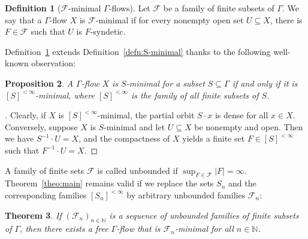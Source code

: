 \documentclass[11pt,reqno,psamsfonts]{amsart}
\theoremstyle{bfnote}
\newtheorem{theo}{Theorem}[section]
\newtheorem{prop}[theo]{Proposition}
\newtheorem{corl}[theo]{Corollary}
\theoremstyle{definition}
\newtheorem{defn}[theo]{Definition}
\theoremstyle{remark}
\newcommand{\0}{\varnothing}
\newcommand{\bemph}[1]{{\normalfont#1}}
\newcommand{\ep}[1]{\bemph{(}#1\bemph{)}}
\newcommand{\emphd}[1]{{\fontseries{b}\selectfont\textsf{#1}}}
\newcommand{\G}{\Gamma}
\newcommand{\fs}[2]{{[{#1}]^{#2}}}
\newcommand{\finset}[1]{\fs{{#1}}{{<\infty}}}
\newcommand{\N}{\mathbb{N}}
\numberwithin{equation}{section}
\newenvironment{scproof}[1][]{\begin{proof}[\textsc{\upshape{Proof}}#1]}{\end{proof}}
\begin{document}
    \begin{defn}[$\mathcal{F}$-minimal $\G$-flows]\label{defn:F-minimal}
        Let $\mathcal{F}$ be a family of finite subsets of $\G$. We say that a $\G$-flow $X$ is \emphd{$\mathcal{F}$-minimal} if for every nonempty open set $U \subseteq X$, there is $F \in \mathcal{F}$ such that $U$ is $F$-syndetic. %
    \end{defn}

    Definition~\ref{defn:F-minimal} extends Definition~\ref{defn:S-minimal} thanks to the following well-known observation:

    \begin{prop}\label{prop:synd1}
        A $\G$-flow $X$ is $S$-minimal for a subset $S \subseteq \G$ if and only if it is $\finset{S}$-minimal, where $\finset{S}$ is the family of all finite subsets of $S$. %
    \end{prop}
    \begin{scproof}
        Clearly, if $X$ is $\finset{S}$-minimal, the partial orbit
        $S \cdot x$ is dense for all $x \in X$. Conversely, suppose $X$ is $S$-minimal and let $U \subseteq X$ be nonempty and open. Then we have  %
        $S^{-1} \cdot U = X$, and the compactness of $X$ yields a finite set $F \in \finset{S}$ such that $F^{-1}\cdot U = X$. %
    \end{scproof}

    A family of finite sets $\mathcal{F}$ is called \emphd{unbounded} if $\sup_{F \in \mathcal{F}} |F| = \infty$. Theorem~\ref{theo:main} %
    remains valid if we replace the sets $S_n$ and the corresponding families $\finset{S_n}$ by {arbitrary} unbounded families $\mathcal{F}_n$: %

    \begin{tcolorbox}
    \begin{theo}\label{theo:main_prime}
        If $(\mathcal{F}_n)_{n \in \N}$ is a sequence of unbounded families of finite subsets of $\G$, then there exists a free $\G$-flow %
        that is $\mathcal{F}_n$-minimal for all $n \in \N$.
    \end{theo}
    \end{tcolorbox}

\end{document}
